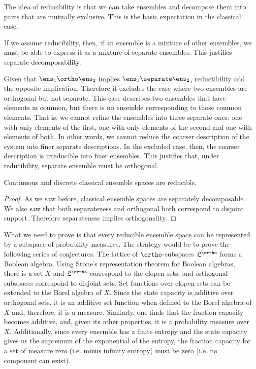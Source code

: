 \begin{justification}
	The idea of reducibility is that we can take ensembles and decompose them into parts that are mutually exclusive. This is the basic expectation in the classical case.
	
	If we assume reducibility, then, if an ensemble is a mixture of other ensembles, we must be able to express it as a mixture of separate ensembles. This justifies separate decomposability.
	
	Given that $\ens_1 \ortho \ens_2$ implies $\ens_1 \separate \ens_2$, reductibility add the opposite implication. Therefore it excludes the case where two ensembles are orthogonal but not separate. This case describes two ensembles that have elements in common, but there is no ensemble corresponding to those common elements. That is, we cannot refine the ensembles into three separate ones: one with only elements of the first, one with only elements of the second and one with elements of both. In other words, we cannot reduce the coarser description of the system into finer separate descriptions. In the excluded case, then, the coarser description is irreducible into finer ensembles. This justifies that, under reducibility, separate ensemble must be orthogonal.
\end{justification}

\begin{prop}
	Continuous and discrete classical ensemble spaces are reducible.
\end{prop}

\begin{proof}
	As we saw before, classical ensemble spaces are separately decomposable. We also saw that both separateness and orthogonal both correspond to disjoint support. Therefore separateness implies orthogonality.
\end{proof}

What we need to prove is that every reducible ensemble space can be represented by a subspace of probability measures. The strategy would be to prove the following series of conjectures. The lattice of $\ortho$-subspaces $\mathfrak{L}^{\ortho}$ forms a Boolean algebra. Using Stone's representation theorem for Boolean algebras, there is a set $X$ and $\mathfrak{L}^{\ortho}$ correspond to the clopen sets, and orthogonal subspaces correspond to disjoint sets. Set functions over clopen sets can be extended to the Borel algebra of $X$. Since the state capacity is additive over orthogonal sets, it is an additive set function when defined to the Borel algebra of $X$ and, therefore, it is a measure. Similarly, one finds that the fraction capacity becomes additive, and, given its other properties, it is a probability measure over $X$. Additionally, since every ensemble has a finite entropy and the state capacity gives us the supremum of the exponential of the entropy, the fraction capacity for a set of measure zero (i.e. minus infinity entropy) must be zero (i.e. no component can exist). 

